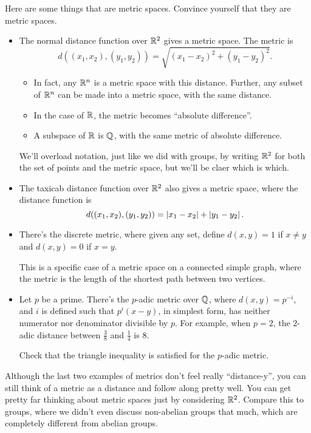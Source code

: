 \documentclass[11pt,paper=letter]{scrartcl}
\begin{document}
Here are some things that are metric spaces. Convince yourself that they are metric spaces.

\begin{itemize}
  \item The normal distance function over $\mathbb R^2$ gives a metric space. The metric is $$d((x_1, x_2 ), (y_1, y_2 )) = \sqrt{ \left( x_1 - x_2 \right)^{2} + \left( y_1 - y_2 \right)^{2} }. $$
  \begin{itemize}
    \item In fact, any $\mathbb R^n$ is a metric space with this distance. Further, any subset of $\mathbb R^n$ can be made into a metric space, with the same distance.
    \item In the case of $\mathbb R$, the metric becomes ``absolute difference''.
    \item A subspace of $\mathbb R$ is $\mathbb Q$, with the same metric of absolute difference.
  \end{itemize}
  \begin{remboxed}
    We'll overload notation, just like we did with groups, by writing $\mathbb R^2$ for both the set of points and the metric space, but we'll be claer which is which.
  \end{remboxed}
  \item The taxicab distance function over $\mathbb R^2$ also gives a metric space, where the distance function is \[
      d((x_1, x_2 ), (y_1, y_2 )) = \left\lvert x_1 - x_2  \right\rvert + \left\lvert  y_1 - y_2 \right\rvert.
    \]
  \item There's the discrete metric, where given any set, define $d(x, y) = 1$ if $x \ne y$ and $d(x, y) = 0$ if $x = y$.
  \begin{remboxed}
    This is a specific case of a metric space on a connected simple graph, where the metric is the length of the shortest path between two vertices.
  \end{remboxed}
  \item Let $p$ be a prime. There's the $p$-adic metric over $\mathbb Q$, where $d(x, y) = p^{-i}$, and $i$ is defined such that $p^i(x - y)$, in simplest form, has neither numerator nor denominator divisible by $p$. For example, when $p = 2$, the $2$-adic distance between $\frac38$ and $\frac14$ is $8$.
  \begin{exrboxed}
    Check that the triangle inequality is satisfied for the $p$-adic metric.
  \end{exrboxed}
\end{itemize}

\begin{remboxed}
  Although the last two examples of metrics don't feel really ``distance-y'', you can still think of a metric as a distance and follow along pretty well. You can get pretty far thinking about metric spaces just by considering $ \mathbb R^{2} $. Compare this to groups, where we didn't even discuss non-abelian groups that much, which are completely different from abelian groups.
\end{remboxed}
\end{document}
